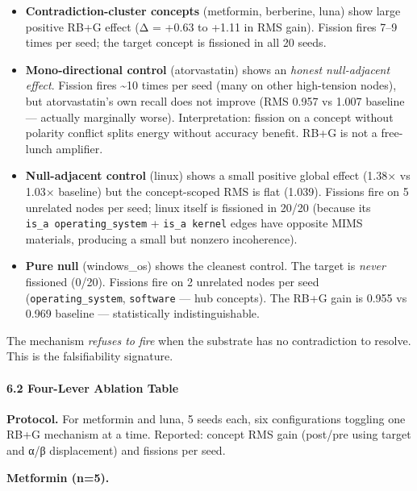 \documentclass[
  11pt,
  a4paper,
]{article}
\providecommand{\tightlist}{%
  \setlength{\itemsep}{0pt}\setlength{\parskip}{0pt}}
\begin{document}
\begin{itemize}
\tightlist
\item
  \textbf{Contradiction-cluster concepts} (metformin, berberine, luna)
  show large positive RB+G effect (Δ = +0.63 to +1.11 in RMS gain).
  Fission fires 7--9 times per seed; the target concept is fissioned in
  all 20 seeds.
\item
  \textbf{Mono-directional control} (atorvastatin) shows an \emph{honest
  null-adjacent effect}. Fission fires \textasciitilde10 times per seed
  (many on other high-tension nodes), but atorvastatin's own recall does
  not improve (RMS 0.957 vs 1.007 baseline --- actually marginally
  worse). Interpretation: fission on a concept without polarity conflict
  splits energy without accuracy benefit. RB+G is not a free-lunch
  amplifier.
\item
  \textbf{Null-adjacent control} (linux) shows a small positive global
  effect (1.38× vs 1.03× baseline) but the concept-scoped RMS is flat
  (1.039). Fissions fire on 5 unrelated nodes per seed; linux itself is
  fissioned in 20/20 (because its \texttt{is\_a\ operating\_system} +
  \texttt{is\_a\ kernel} edges have opposite MIMS materials, producing a
  small but nonzero incoherence).
\item
  \textbf{Pure null} (windows\_os) shows the cleanest control. The
  target is \emph{never} fissioned (0/20). Fissions fire on 2 unrelated
  nodes per seed (\texttt{operating\_system}, \texttt{software} --- hub
  concepts). The RB+G gain is 0.955 vs 0.969 baseline --- statistically
  indistinguishable.
\end{itemize}

The mechanism \emph{refuses to fire} when the substrate has no
contradiction to resolve. This is the falsifiability signature.

\paragraph{6.2 Four-Lever Ablation
Table}\label{four-lever-ablation-table}

\textbf{Protocol.} For metformin and luna, 5 seeds each, six
configurations toggling one RB+G mechanism at a time. Reported: concept
RMS gain (post/pre using target and α/β displacement) and fissions per
seed.

\textbf{Metformin (n=5).}
\end{document}
